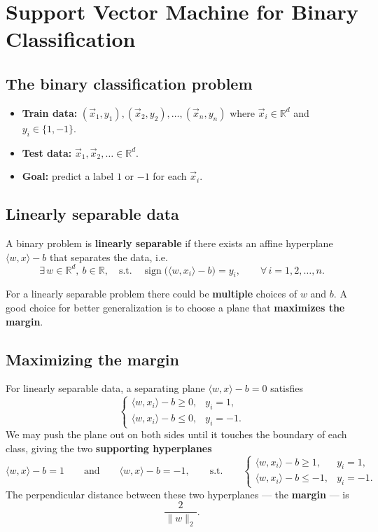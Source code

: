 \documentclass[
  letterpaper,
  DIV=11,
  numbers=noendperiod]{scrreprt}
\providecommand{\tightlist}{%
  \setlength{\itemsep}{0pt}\setlength{\parskip}{0pt}}
\theoremstyle{definition}
\theoremstyle{plain}
\theoremstyle{plain}
\theoremstyle{definition}
\theoremstyle{plain}
\theoremstyle{plain}
\theoremstyle{remark}
\begin{document}
\section{Support Vector Machine for Binary
Classification}\label{support-vector-machine-for-binary-classification}

\subsection{The binary classification
problem}\label{the-binary-classification-problem}

\begin{itemize}
\tightlist
\item
  \textbf{Train data:}
  \((\vec{x}_1, y_1), (\vec{x}_2, y_2), \dots, (\vec{x}_n, y_n)\) where
  \(\vec{x}_i \in \mathbb{R}^d\) and \(y_i \in \{1, -1\}\).
\item
  \textbf{Test data:} \(\vec{x}_1, \vec{x}_2, \dots \in \mathbb{R}^d\).
\item
  \textbf{Goal:} predict a label \(1\) or \(-1\) for each \(\vec{x}_i\).
\end{itemize}

\subsection{Linearly separable data}\label{linearly-separable-data}

A binary problem is \textbf{linearly separable} if there exists an
affine hyperplane \(\langle w, x\rangle - b\) that separates the data,
i.e. \[
\exists\, w \in \mathbb{R}^d,\ b \in \mathbb{R}, \quad\text{s.t.}\quad
\operatorname{sign}\!\big(\langle w, x_i\rangle - b\big) = y_i,
\qquad \forall\, i = 1, 2, \dots, n .
\]

For a linearly separable problem there could be \textbf{multiple}
choices of \(w\) and \(b\). A good choice for better generalization is
to choose a plane that \textbf{maximizes the margin}.

\subsection{Maximizing the margin}\label{maximizing-the-margin}

For linearly separable data, a separating plane
\(\langle w, x\rangle - b = 0\) satisfies \[
\begin{cases}
\langle w, x_i\rangle - b \ge 0, & y_i = 1, \\
\langle w, x_i\rangle - b \le 0, & y_i = -1 .
\end{cases}
\] We may push the plane out on both sides until it touches the boundary
of each class, giving the two \textbf{supporting hyperplanes} \[
\langle w, x\rangle - b = 1
\qquad\text{and}\qquad
\langle w, x\rangle - b = -1,
\qquad\text{s.t.}\qquad
\begin{cases}
\langle w, x_i\rangle - b \ge 1, & y_i = 1, \\
\langle w, x_i\rangle - b \le -1, & y_i = -1 .
\end{cases}
\] The perpendicular distance between these two hyperplanes --- the
\textbf{margin} --- is \[
\frac{2}{\|w\|_2} .
\]
\end{document}
